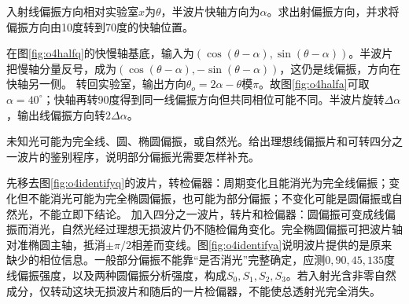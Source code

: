 \begin{example}\label{ex:o4half}
入射线偏振方向相对实验室$x$为$\theta$，半波片快轴方向为$\alpha$。求出射偏振方向，并求将偏振方向由10度转到70度的快轴位置。
\end{example}
\begin{solution}
在图\ref{fig:o4halfq}的快慢轴基底，输入为$(\cos(\theta-\alpha),\sin(\theta-\alpha))$。半波片把慢轴分量反号，成为$(\cos(\theta-\alpha),-\sin(\theta-\alpha))$，这仍是线偏振，方向在快轴另一侧。
转回实验室，输出方向$\theta_o=2\alpha-\theta$模$\pi$。故图\ref{fig:o4halfa}可取$\alpha=40^\circ$；快轴再转90度得到同一线偏振方向但共同相位可能不同。半波片旋转$\Delta\alpha$，输出线偏振方向转$2\Delta\alpha$。
\end{solution}

\begin{example}\label{ex:o4identify}
未知光可能为完全线、圆、椭圆偏振，或自然光。给出理想线偏振片和可转四分之一波片的鉴别程序，说明部分偏振光需要怎样补充。
\end{example}
\begin{solution}
先移去图\ref{fig:o4identifyq}的波片，转检偏器：周期变化且能消光为完全线偏振；变化但不能消光可能为完全椭圆偏振，也可能为部分偏振；不变化可能是圆偏振或自然光，不能立即下结论。
加入四分之一波片，转片和检偏器：圆偏振可变成线偏振而消光，自然光经过理想无损波片仍不随检偏角变化。完全椭圆偏振可把波片轴对准椭圆主轴，抵消$\pm\pi/2$相差而变线。图\ref{fig:o4identifya}说明波片提供的是原来缺少的相位信息。一般部分偏振不能靠“是否消光”完整确定，应测$0,90,45,135$度线偏振强度，以及两种圆偏振分析强度，构成$S_0,S_1,S_2,S_3$。若入射光含非零自然成分，仅转动这块无损波片和随后的一片检偏器，不能使总透射光完全消失。
\end{solution}

